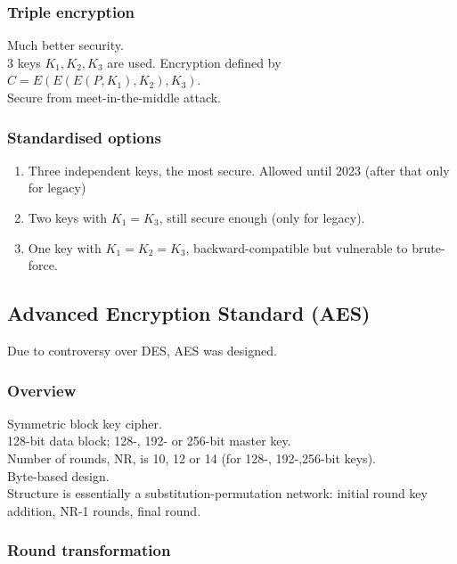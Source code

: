 \documentclass{article}
\begin{document}
\subsubsection{Triple encryption}

Much better security.\\
3 keys $K_1, K_2, K_3$ are used. Encryption defined by $C = E(E(E(P,K_1),K_2),K_3)$.\\
Secure from meet-in-the-middle attack.

\subsubsection{Standardised options}

\begin{enumerate}
    \item Three independent keys, the most secure. Allowed until 2023 (after that only for legacy)
    \item Two keys with $K_1 = K_3$, still secure enough (only for legacy).
    \item One key with $K_1 = K_2 = K_3$, backward-compatible but vulnerable to brute-force.
\end{enumerate}

\subsection{Advanced Encryption Standard (AES)}

Due to controversy over DES, AES was designed.\\

\subsubsection{Overview}

Symmetric block key cipher.\\
128-bit data block; 128-, 192- or 256-bit master key.\\
Number of rounds, NR, is 10, 12 or 14 (for 128-, 192-,256-bit keys).\\
Byte-based design.\\
Structure is essentially a substitution-permutation network: initial round key addition, NR-1 rounds, final round.

\subsubsection{Round transformation}
\end{document}
